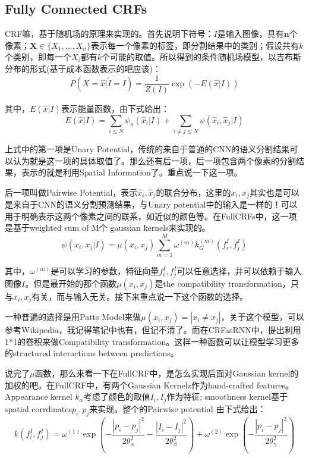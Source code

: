 \subsection{Fully Connected CRFs}

CRF嘛，基于随机场的原理来实现的。首先说明下符号：$I$是输入图像，具有$\mathbf{n}$个像素；$\mathbf{X}\in \{ X_1, \ldots, X_n \}$表示每一个像素的标签，即分割结果中的类别；假设共有$k$个类别，即每一个$X_i$都有$k$个可能的取值。所以得到的条件随机场模型，以吉布斯分布的形式(基于成本函数表示的吧应该)：
\begin{displaymath}
P(X=\hat{x}|\tilde{I}=I) = \frac{1}{Z(I)}\exp(-E(\hat{x}|I))
\end{displaymath}

其中，$E(\hat{x}|I)$表示能量函数，由下式给出：
\begin{displaymath}
E(\hat{x}|I) = \sum_{i \le N}\psi_u(\hat{x}_i|I) + \sum_{i\ne j \le N}\psi(\hat{x}_i, \hat{x}_j | I)
\end{displaymath}

上式中的第一项是Unary Potential，传统的来自于普通的CNN的语义分割结果可以认为就是这一项的具体取值了。那么还有后一项，后一项包含两个像素的分割结果，表示的就是利用Spatial Information了。重点说一下这一项。

后一项叫做Pairwise Potential，表示$\hat{x}_i, \hat{x}_j$的联合分布，这里的$x_i, x_j$其实也是可以是来自于CNN的语义分割预测结果，与Unary potential中的输入是一样的！可以用于明确表示这两个像素之间的联系，如近似的颜色等。在FullCRFs中，这一项是基于weighted sum of M个 gaussian kernels来实现的。
\begin{displaymath}
\psi(x_i, x_j | I) = \mu(x_i, x_j)\sum_{m=1}^{M}\omega^{(m)}k_G^{(m)}\left( f_i^I, f_j^I \right)
\end{displaymath}

其中，$\omega^{(m)}$是可以学习的参数，特征向量$f_i^I, f_j^I$可以任意选择，并可以依赖于输入图像$I$。但是最开始的那个函数$\mu(x_i, x_j)$是the compatibility transformation，只与$x_i, x_j$有关，而与输入无关。接下来重点说一下这个函数的选择。

一种普遍的选择是用Patts Model来做$\mu(x_i, x_j) = |x_i \ne x_j |$，关于这个模型，可以参考Wikipedia，我记得笔记中也有，但记不清了。而在CRFasRNN中，提出利用1*1的卷积来做Compatibility transformation。这样一种函数可以让模型学习更多的structured interactions between predictions。

说完了$\mu$函数，那么来看一下在FullCRF中，是怎么实现后面对Gaussian kernel的加权的吧。在FullCRF中，有两个Gaussian Kernelz作为hand-crafted features。Appearance kernel $k_\alpha$考虑了颜色的取值$I_i, I_j$作为特征; smoothness kernel基于spatial corrdinates$p_i, p_j$来实现。整个的Pairwise potential 由下式给出：
\begin{displaymath} 
k(f_i^I, f_j^I) = \omega^{(1)}\exp\left( -\frac{|p_i - p_j|^2}{2\theta_\alpha^2} -\frac{|I_i - I_j|^2}{2\theta_\beta^2} \right) + \omega^{(2)}\exp\left( -\frac{|p_i - p_j|^2}{2\theta_\gamma^2} \right)
\end{displaymath}

